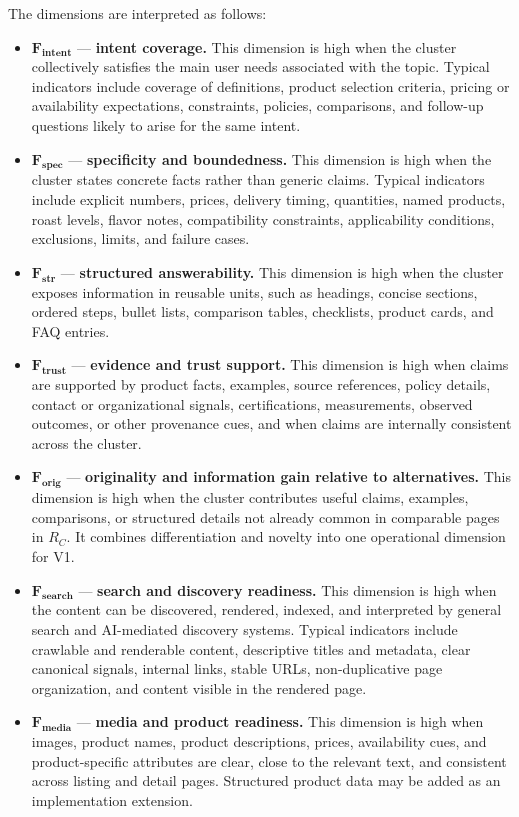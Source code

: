 \documentclass{article}
\begin{document}
The dimensions are interpreted as follows:
\begin{itemize}
    \item \(\mathbf{F_{\text{intent}}}\) --- \textbf{intent coverage.} This dimension is high when the cluster collectively satisfies the main user needs associated with the topic. Typical indicators include coverage of definitions, product selection criteria, pricing or availability expectations, constraints, policies, comparisons, and follow-up questions likely to arise for the same intent.
    \item \(\mathbf{F_{\text{spec}}}\) --- \textbf{specificity and boundedness.} This dimension is high when the cluster states concrete facts rather than generic claims. Typical indicators include explicit numbers, prices, delivery timing, quantities, named products, roast levels, flavor notes, compatibility constraints, applicability conditions, exclusions, limits, and failure cases.
    \item \(\mathbf{F_{\text{str}}}\) --- \textbf{structured answerability.} This dimension is high when the cluster exposes information in reusable units, such as headings, concise sections, ordered steps, bullet lists, comparison tables, checklists, product cards, and FAQ entries.
    \item \(\mathbf{F_{\text{trust}}}\) --- \textbf{evidence and trust support.} This dimension is high when claims are supported by product facts, examples, source references, policy details, contact or organizational signals, certifications, measurements, observed outcomes, or other provenance cues, and when claims are internally consistent across the cluster.
    \item \(\mathbf{F_{\text{orig}}}\) --- \textbf{originality and information gain relative to alternatives.} This dimension is high when the cluster contributes useful claims, examples, comparisons, or structured details not already common in comparable pages in \(R_C\). It combines differentiation and novelty into one operational dimension for V1.
    \item \(\mathbf{F_{\text{search}}}\) --- \textbf{search and discovery readiness.} This dimension is high when the content can be discovered, rendered, indexed, and interpreted by general search and AI-mediated discovery systems. Typical indicators include crawlable and renderable content, descriptive titles and metadata, clear canonical signals, internal links, stable URLs, non-duplicative page organization, and content visible in the rendered page.
    \item \(\mathbf{F_{\text{media}}}\) --- \textbf{media and product readiness.} This dimension is high when images, product names, product descriptions, prices, availability cues, and product-specific attributes are clear, close to the relevant text, and consistent across listing and detail pages. Structured product data may be added as an implementation extension.

\end{itemize}
\end{document}
